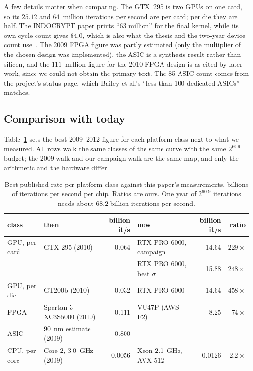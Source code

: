 A few details matter when comparing. The GTX~295 is two GPUs on one
card, so its $25.12$ and $64$~million iterations per second are per
card; per die they are half. The INDOCRYPT paper prints ``63 million''
for the final kernel, while its own cycle count gives $64.0$, which is
also what the thesis and the two-year device count
use~\cite{bernstein2010gpu,niederhagen2012thesis}. The 2009 FPGA figure
was partly estimated (only the multiplier of the chosen design was
implemented), the ASIC is a synthesis result rather than silicon, and
the $111$~million figure for the 2010 FPGA design is as cited by later
work, since we could not obtain the primary text. The 85-ASIC count
comes from the project's status page, which Bailey et al.'s ``less than
100 dedicated ASICs'' matches.



\subsection{Comparison with today}
\label{sec:history-compare}

Table~\ref{tab:history-compare} sets the best 2009--2012 figure for
each platform class next to what we measured. All rows walk the same
classes of the same curve with the same $2^{60.9}$ budget; the 2009
walk and our campaign walk are the same map, and only the arithmetic
and the hardware differ.

\begin{table}[t]
\centering
\footnotesize
\caption{Best published rate per platform class against this paper's
  measurements, billions of iterations per second per chip. Ratios
  are ours. One year of $2^{60.9}$ iterations needs about $68.2$ billion
  iterations per second.}
\label{tab:history-compare}
\begin{tabular}{@{}llrlrr@{}}
\toprule
class & then & billion it/s & now & billion it/s & ratio \\
\midrule
GPU, per card & GTX 295 (2010) & 0.064 & RTX PRO 6000, campaign & 14.64 & $229\times$ \\
 & & & RTX PRO 6000, best $\sigma$ & 15.88 & $248\times$ \\
GPU, per die & GT200b (2010) & 0.032 & RTX PRO 6000 & 14.64 & $458\times$ \\
FPGA & Spartan-3 XC3S5000 (2010) & 0.111 & VU47P (AWS F2) & 8.25 & $74\times$ \\
ASIC & 90~nm estimate (2009) & 0.800 & --- & --- & --- \\
CPU, per core & Core 2, 3.0~GHz (2009) & 0.0056 & Xeon 2.1~GHz, AVX-512 & 0.0126 & $2.2\times$ \\
\bottomrule
\end{tabular}
\end{table}

